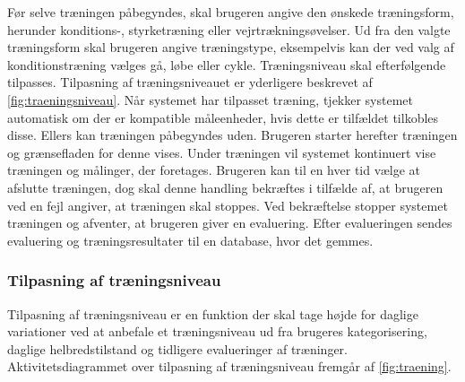 \noindent
Før selve træningen påbegyndes, skal brugeren angive den ønskede træningsform, herunder konditions-, styrketræning eller vejrtrækningsøvelser. Ud fra den valgte træningsform skal brugeren angive træningstype, eksempelvis kan der ved valg af konditionstræning vælges gå, løbe eller cykle. Træningsniveau skal efterfølgende tilpasses. Tilpasning af træningsniveauet er  yderligere beskrevet af \autoref{fig:traeningsniveau}. Når systemet har tilpasset træning, tjekker systemet automatisk om der er kompatible måleenheder, hvis dette er tilfældet tilkobles disse. Ellers kan træningen påbegyndes uden. Brugeren starter herefter træningen og grænsefladen for denne vises. Under træningen vil systemet kontinuert vise træningen og målinger, der foretages. Brugeren kan til en hver tid vælge at afslutte træningen, dog skal denne handling bekræftes i tilfælde af, at brugeren ved en fejl angiver, at træningen skal stoppes. 
Ved bekræftelse stopper systemet træningen og afventer, at brugeren giver en evaluering. Efter evalueringen sendes evaluering og træningsresultater til en database, hvor det gemmes.


\subsubsection*{Tilpasning af træningsniveau} \label{sec:traeningsniveau}
Tilpasning af træningsniveau er en funktion der skal tage højde for daglige variationer ved at anbefale et træningsniveau ud fra brugeres kategorisering, daglige helbredstilstand og tidligere evalueringer af træninger.  
Aktivitetsdiagrammet over tilpasning af træningsniveau fremgår af \autoref{fig:traening}.
 
